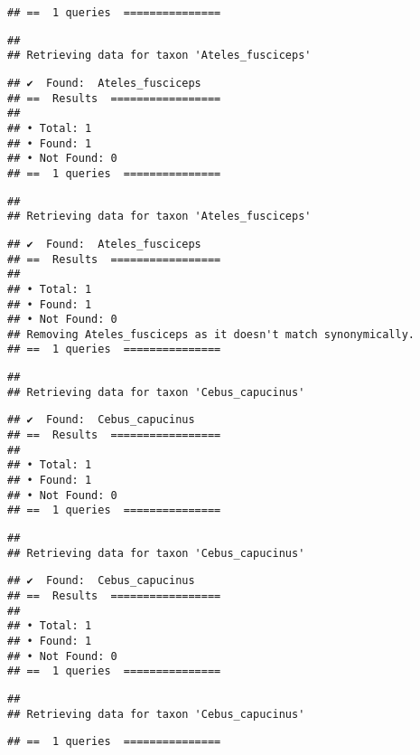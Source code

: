 \documentclass[
]{article}
\begin{document}
\begin{verbatim}
## ==  1 queries  ===============
\end{verbatim}

\begin{verbatim}
## 
## Retrieving data for taxon 'Ateles_fusciceps'
\end{verbatim}

\begin{verbatim}
## ✔  Found:  Ateles_fusciceps
## ==  Results  =================
## 
## • Total: 1 
## • Found: 1 
## • Not Found: 0
## ==  1 queries  ===============
\end{verbatim}

\begin{verbatim}
## 
## Retrieving data for taxon 'Ateles_fusciceps'
\end{verbatim}

\begin{verbatim}
## ✔  Found:  Ateles_fusciceps
## ==  Results  =================
## 
## • Total: 1 
## • Found: 1 
## • Not Found: 0
## Removing Ateles_fusciceps as it doesn't match synonymically.
## ==  1 queries  ===============
\end{verbatim}

\begin{verbatim}
## 
## Retrieving data for taxon 'Cebus_capucinus'
\end{verbatim}

\begin{verbatim}
## ✔  Found:  Cebus_capucinus
## ==  Results  =================
## 
## • Total: 1 
## • Found: 1 
## • Not Found: 0
## ==  1 queries  ===============
\end{verbatim}

\begin{verbatim}
## 
## Retrieving data for taxon 'Cebus_capucinus'
\end{verbatim}

\begin{verbatim}
## ✔  Found:  Cebus_capucinus
## ==  Results  =================
## 
## • Total: 1 
## • Found: 1 
## • Not Found: 0
## ==  1 queries  ===============
\end{verbatim}

\begin{verbatim}
## 
## Retrieving data for taxon 'Cebus_capucinus'
\end{verbatim}

\begin{verbatim}
## ==  1 queries  ===============
\end{verbatim}
\end{document}
